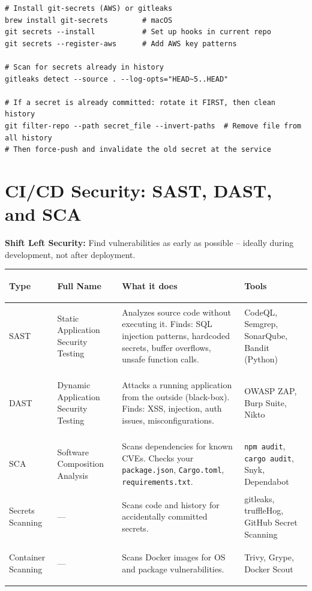 \documentclass[11pt, letterpaper]{article}
\begin{document}
\begin{lstlisting}[style=shell, caption={Prevent committing secrets to git}]
# Install git-secrets (AWS) or gitleaks
brew install git-secrets        # macOS
git secrets --install           # Set up hooks in current repo
git secrets --register-aws      # Add AWS key patterns

# Scan for secrets already in history
gitleaks detect --source . --log-opts="HEAD~5..HEAD"

# If a secret is already committed: rotate it FIRST, then clean history
git filter-repo --path secret_file --invert-paths  # Remove file from all history
# Then force-push and invalidate the old secret at the service
\end{lstlisting}

\section*{CI/CD Security: SAST, DAST, and SCA}

\textbf{Shift Left Security:} Find vulnerabilities as early as possible -- ideally during development, not after deployment.

\noindent
{\renewcommand{\arraystretch}{1.6}
\begin{tabularx}{\textwidth}{>{\bfseries\raggedright\arraybackslash}p{1.5cm}
                              >{\bfseries\raggedright\arraybackslash}p{3.5cm}
                              >{\raggedright\arraybackslash}X
                              >{\raggedright\arraybackslash}p{3cm}}
\toprule
\rowcolor{tableheadergreen}
\textbf{Type} & \textbf{Full Name} & \textbf{What it does} & \textbf{Tools} \\
\midrule
\rowcolor{rowA}  SAST & Static Application Security Testing & Analyzes source code without executing it. Finds: SQL injection patterns, hardcoded secrets, buffer overflows, unsafe function calls. & CodeQL, Semgrep, SonarQube, Bandit (Python) \\
\rowcolor{rowBg} DAST & Dynamic Application Security Testing & Attacks a running application from the outside (black-box). Finds: XSS, injection, auth issues, misconfigurations. & OWASP ZAP, Burp Suite, Nikto \\
\rowcolor{rowA}  SCA  & Software Composition Analysis & Scans dependencies for known CVEs. Checks your \texttt{package.json}, \texttt{Cargo.toml}, \texttt{requirements.txt}. & \texttt{npm audit}, \texttt{cargo audit}, Snyk, Dependabot \\
\rowcolor{rowBg} Secrets Scanning & --- & Scans code and history for accidentally committed secrets. & gitleaks, truffleHog, GitHub Secret Scanning \\
\rowcolor{rowA}  Container Scanning & --- & Scans Docker images for OS and package vulnerabilities. & Trivy, Grype, Docker Scout \\
\bottomrule
\end{tabularx}}
\end{document}
